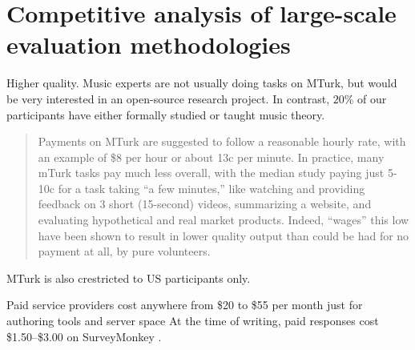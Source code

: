 \section{Competitive analysis of large-scale evaluation methodologies}



Higher quality. Music experts are not usually doing tasks on MTurk, but would
be very interested in an open-source research project. In contrast, $20\%$
 of our participants have either formally studied
or taught music theory.

\begin{quote}
Payments on MTurk are suggested to follow a reasonable hourly rate, with an
example of \$8 per hour or about 13c per minute. In practice, many mTurk
tasks pay much less overall, with the median study paying just 5-10c for a task
taking ``a few minutes,'' like watching and providing feedback on 3 short
(15-second) videos, summarizing a website, and evaluating hypothetical and real
market products. Indeed, ``wages'' this low have been shown to result in lower
quality output than could be had for no payment at all, by pure volunteers.
\end{quote}
\citep{downs2010your}

MTurk is also crestricted to US participants only\cite{quick2014kulitta}.

Paid service providers cost anywhere from \$20 to \$55 per month
just for authoring tools and server space\citep{JCC4:JCC411} At the time of writing,
paid responses cost \$1.50--\$3.00 on SurveyMonkey \citep{uksurveymonkey}.
